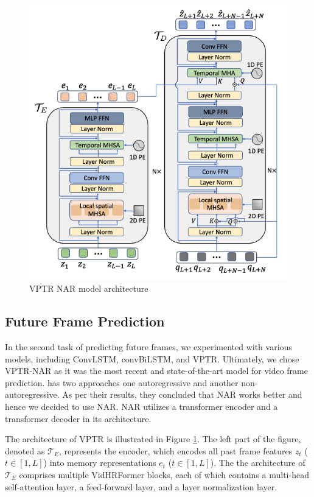 \documentclass{article}
\begin{document}
\begin{figure}
  \centering
  \includegraphics[scale=0.25]{VPTR_arc.png}
  \caption{VPTR NAR model architecture}
  \label{fig:architecture}
\end{figure}

\subsection{Future Frame Prediction}
In the second task of predicting future frames, we experimented with various models, including 
ConvLSTM, convBiLSTM, and VPTR. Ultimately, we chose VPTR-NAR as it was the most recent and 
state-of-the-art model for video frame prediction. \citet{Ye2022VPTRET} has two approaches one 
autoregressive and another non-autoregressive. As per their results, they concluded that
NAR works better and hence we decided to use NAR. NAR utilizes a transformer encoder and a 
transformer decoder in its architecture.

The architecture of VPTR is illustrated in Figure \ref{fig:architecture}. The left part of the 
figure, denoted as $\mathcal{T}_E$, represents the encoder, which encodes all past frame 
features $z_t$ ($t \in [1, L]$) into memory representations $e_t$ ($t \in [1, L]$). The 
the architecture of $\mathcal{T}_E$ comprises multiple VidHRFormer blocks, each of which contains a 
multi-head self-attention layer, a feed-forward layer, and a layer normalization layer.
\end{document}

